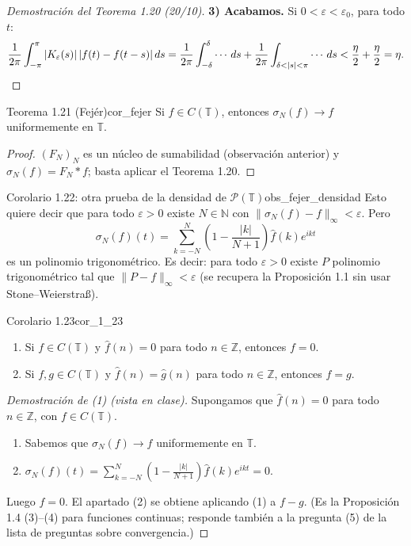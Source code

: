 \begin{proof}[Demostración del Teorema 1.20 (20/10)]
\textbf{3) Acabamos.} Si $0 < \varepsilon < \varepsilon_0$, para todo $t$:
\[
\frac{1}{2\pi}\int_{-\pi}^{\pi}|K_\varepsilon(s)|\,|f(t)-f(t-s)|\,ds = \frac{1}{2\pi}\int_{-\delta}^{\delta}\cdots\,ds + \frac{1}{2\pi}\int_{\delta<|s|<\pi}\cdots\,ds < \frac{\eta}{2} + \frac{\eta}{2} = \eta. \qedhere
\]
\end{proof}

\begin{teorema}{Teorema 1.21 (Fejér)}{cor_fejer}
Si $f \in C(\mathbb{T})$, entonces $\sigma_N(f) \to f$ uniformemente en $\mathbb{T}$.
\end{teorema}

\begin{proof}
$(F_N)_N$ es un núcleo de sumabilidad (observación anterior) y $\sigma_N(f) = F_N * f$; basta aplicar el Teorema 1.20.
\end{proof}

\begin{observacion}{Corolario 1.22: otra prueba de la densidad de $\mathcal{P}(\mathbb{T})$}{obs_fejer_densidad}
Esto quiere decir que para todo $\varepsilon > 0$ existe $N \in \mathbb{N}$ con $\|\sigma_N(f) - f\|_\infty < \varepsilon$. Pero
\[
\sigma_N(f)(t) = \sum_{k=-N}^{N}\left(1 - \frac{|k|}{N+1}\right)\hat{f}(k)e^{ikt}
\]
es un polinomio trigonométrico. Es decir: para todo $\varepsilon > 0$ existe $P$ polinomio trigonométrico tal que $\|P - f\|_\infty < \varepsilon$ (se recupera la Proposición 1.1 sin usar Stone--Weierstraß).
\end{observacion}

\begin{proposicion}{Corolario 1.23}{cor_1_23}
\begin{enumerate}
\item[(1)] Si $f \in C(\mathbb{T})$ y $\hat{f}(n) = 0$ para todo $n \in \mathbb{Z}$, entonces $f = 0$.
\item[(2)] Si $f, g \in C(\mathbb{T})$ y $\hat{f}(n) = \hat{g}(n)$ para todo $n \in \mathbb{Z}$, entonces $f = g$.
\end{enumerate}
\end{proposicion}

\begin{proof}[Demostración de (1) (vista en clase)]
Supongamos que $\hat{f}(n) = 0$ para todo $n \in \mathbb{Z}$, con $f \in C(\mathbb{T})$.
\begin{enumerate}
\item[1)] Sabemos que $\sigma_N(f) \to f$ uniformemente en $\mathbb{T}$.
\item[2)] $\sigma_N(f)(t) = \sum_{k=-N}^{N}\left(1-\frac{|k|}{N+1}\right)\hat{f}(k)e^{ikt} = 0$.
\end{enumerate}
Luego $f = 0$. El apartado (2) se obtiene aplicando (1) a $f - g$. (Es la Proposición 1.4 (3)--(4) para funciones continuas; responde también a la pregunta (5) de la lista de preguntas sobre convergencia.)
\end{proof}

